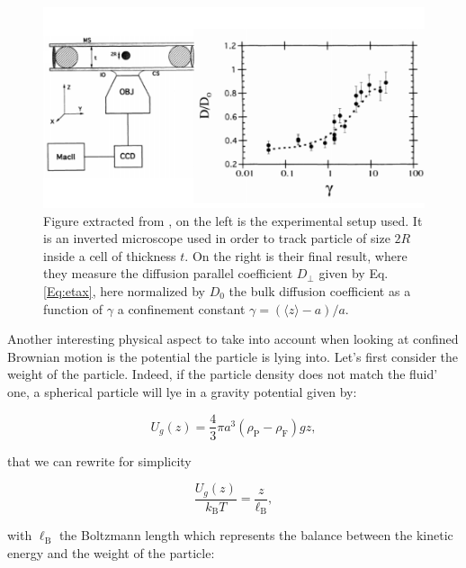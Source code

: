\begin{figure}
	\centering
	\includegraphics{02_body/chapter1/image/libchaber.pdf}
	\caption{Figure extracted from \cite{faucheux_confined_1994}, on the left is the experimental setup used. It is an inverted microscope used in order to track particle of size $2R$ inside a cell of thickness $t$. On the right is their final result, where they measure the diffusion parallel coefficient $D_\bot$ given by Eq.\ref{Eq:etax}, here normalized by $D_0$ the bulk diffusion coefficient as a function of  $\gamma$ a confinement constant $\gamma = (\langle z \rangle -a)/a$. }
	\label{fig:libchaber}
\end{figure}

Another interesting physical aspect to take into account when looking at confined Brownian motion is the potential the particle is lying into. Let's first consider the weight of the particle. Indeed, if the particle density does not match the fluid' one, a spherical particle will lye in a gravity potential given by:

\begin{equation}
	U_g(z) = \frac{4}{3} \pi a^3 (\rho_\mathrm{P} - \rho_\mathrm{F})gz,
\end{equation}


that we can rewrite for simplicity

\begin{equation}
	\frac{U_g(z)}{k_\mathrm{B} T} = \frac{z}{\ell_\mathrm{B}},
\end{equation}

with $\ell_\mathrm{B}$ the Boltzmann length which represents the balance between the kinetic energy and the weight of the particle:

